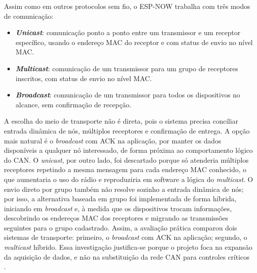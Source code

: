 Assim como em outros protocolos sem fio, o ESP-NOW trabalha com três modos de comunicação:
\begin{itemize}
    \item \textbf{\emph{Unicast}}: comunicação ponto a ponto entre um transmissor e um receptor específico, 
    usando o endereço MAC do receptor e com status de envio no nível MAC.
    \item \textbf{\emph{Multicast}}: comunicação de um transmissor para um grupo de receptores inscritos, 
    com status de envio no nível MAC.
    \item \textbf{\emph{Broadcast}}: comunicação de um transmissor para todos os dispositivos no alcance, 
    sem confirmação de recepção.
\end{itemize}

A escolha do meio de transporte não é direta, pois o sistema precisa conciliar entrada dinâmica de nós, múltiplos receptores e confirmação de entrega. A opção mais natural é o \emph{broadcast} com ACK na aplicação, por manter os dados disponíveis a qualquer nó interessado, de forma próxima ao comportamento lógico do CAN. O \emph{unicast}, por outro lado, foi descartado porque só atenderia múltiplos receptores repetindo a mesma mensagem para cada endereço MAC conhecido, o que aumentaria o uso do rádio e reproduziria em software a lógica do \emph{multicast}. O envio direto por grupo também não resolve sozinho a entrada dinâmica de nós; por isso, a alternativa baseada em grupo foi implementada de forma híbrida, iniciando em \emph{broadcast} e, à medida que os dispositivos trocam informações, descobrindo os endereços MAC dos receptores e migrando as transmissões seguintes para o grupo cadastrado. Assim, a avaliação prática comparou dois sistemas de transporte: primeiro, o \emph{broadcast} com ACK na aplicação; segundo, o \emph{multicast} híbrido. Essa investigação justifica-se porque o projeto foca na expansão da aquisição de dados, e não na substituição da rede CAN para controles críticos \cite{fernandes2022_formula_sae_wifi_can}.
